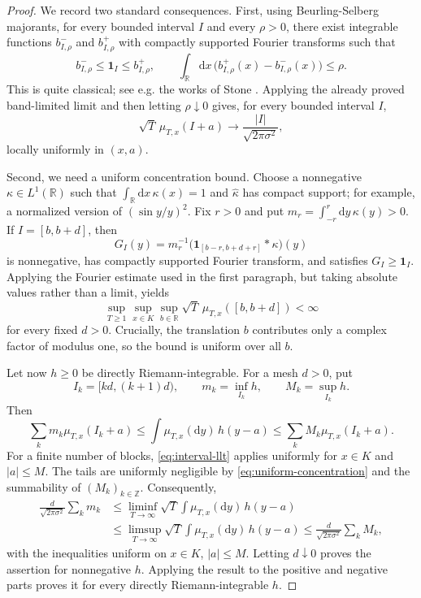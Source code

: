 \documentclass[11pt,reqno]{amsart}
\theoremstyle{definition}
\numberwithin{equation}{section}
\newcommand{\<}{\langle}
\renewcommand{\>}{\rangle}
\def\R{{\mathbb R}}
\def\de{{\rm d}}
\def\de{{\mathrm {d}}}
\def\bbR{{\mathbb{R}}}
\begin{document}
\begin{appendix}
\begin{proof}
We record two standard consequences.  First, using Beurling-Selberg majorants, for every bounded interval $I$ and every
$\rho>0$, there exist integrable functions $b^-_{I,\rho}$ and
$b^+_{I,\rho}$ with compactly supported Fourier transforms such that
\[
 b^-_{I,\rho}\leq\mathbf 1_I\leq b^+_{I,\rho},
 \qquad
 \int_\R \de x \, \big(b^+_{I,\rho} (x) -b^-_{I,\rho} (x)\big)\leq\rho.
\]
This is quite classical; see e.g. the works of Stone
\cite{StoneLLT,StoneRatio}.  Applying the already proved band-limited limit
and then letting $\rho\downarrow0$ gives, for every bounded interval $I$,
\begin{equation}
 \sqrt T\,\mu_{T,x}(I+a)
 \longrightarrow
 \frac{|I|}{\sqrt{2\pi\sigma^2}},
 \label{eq:interval-llt}
\end{equation}
locally uniformly in $(x,a)$.

Second, we need a uniform concentration bound.  Choose a nonnegative
$\kappa\in L^1(\R)$ such that $\int_\R \de x \, \kappa (x) =1$ and
$\widehat\kappa$ has compact support; for example, a normalized version of
$(\sin y/y)^2$.  Fix $r>0$ and put
$m_r=\int_{-r}^r \de y \,\kappa(y)>0$.  If $I=[b,b+d]$, then
\[
 G_I(y)=m_r^{-1}
 \bigl(\mathbf 1_{[b-r,b+d+r]}*\kappa\bigr)(y)
\]
is nonnegative, has compactly supported Fourier transform, and satisfies
$G_I\geq\mathbf 1_I$.  Applying the Fourier estimate used in the first paragraph,
but taking absolute values rather than a limit, yields
\begin{equation}
 \sup_{T\geq1}\sup_{x\in K}\sup_{b\in\bbR}
 \sqrt T\,\mu_{T,x}([b,b+d])<\infty
 \label{eq:uniform-concentration}
\end{equation}
for every fixed $d>0$.  Crucially, the translation $b$ contributes only a
complex factor of modulus one, so the bound is uniform over all $b$.

Let now $h\geq0$ be directly Riemann-integrable.  For a mesh $d>0$, put
\[
 I_k=[kd,(k+1)d),\qquad
 m_k=\inf_{I_k}h,\qquad M_k=\sup_{I_k}h.
\]
Then
\[
 \sum_km_k\mu_{T,x}(I_k+a)
 \leq\int \mu_{T,x}(\de y) \, h(y-a)
 \leq\sum_kM_k\mu_{T,x}(I_k+a).
\]
For a finite number of blocks, \eqref{eq:interval-llt} applies uniformly for
$x\in K$ and $|a|\leq M$.  The tails are uniformly negligible by
\eqref{eq:uniform-concentration} and the summability of
$(M_k)_{k\in\mathbb Z}$.  Consequently,
\begin{align*}
 \frac{d}{\sqrt{2\pi\sigma^2}}\sum_km_k
 &\leq \liminf_{T\to\infty}
       \sqrt T\int \mu_{T,x}(\de y) \, h(y-a)\\
 &\leq \limsup_{T\to\infty}
       \sqrt T\int \mu_{T,x}(\de y) \, h(y-a)
 \leq\frac{d}{\sqrt{2\pi\sigma^2}}\sum_kM_k,
\end{align*}
with the inequalities uniform on $x\in K$, $|a|\leq M$.  Letting
$d\downarrow0$ proves the assertion for nonnegative $h$.  Applying the result
to the positive and negative parts proves it for every directly
Riemann-integrable $h$.
\end{proof}

\end{appendix}
\end{document}
